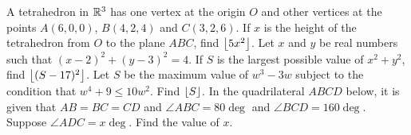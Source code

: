 \begin{enumerate}
    \begin{center}
    \end{center}
    \hyperrefitem[Q::2022-O-1-7] A tetrahedron in $\mathbb{R}^3$ has one vertex at the origin $O$ and other vertices at the points $A(6, 0, 0)$, $B(4, 2, 4)$ and $C(3, 2, 6)$. If $x$ is the height of the tetrahedron from $O$ to the plane $ABC$, find $\left\lfloor 5x^2 \right\rfloor$.
    \hyperrefitem[Q::2022-O-1-8] Let $x$ and $y$ be real numbers such that $(x-2)^2 + (y-3)^2 = 4$. If $S$ is the largest possible value of $x^2 + y^2$, find $\left\lfloor (S-17)^2 \right\rfloor$.
    \hyperrefitem[Q::2022-O-1-9] Let $S$ be the maximum value of $w^3 - 3w$ subject to the condition that $w^4 + 9 \leq 10w^2$. Find $\left\lfloor S \right\rfloor$.
    \hyperrefitem[Q::2022-O-1-10] In the quadrilateral $ABCD$ below, it is given that $AB = BC = CD$ and $\angle ABC = 80\deg$ and $\angle BCD = 160 \deg$. Suppose $\angle ADC = x\deg$. Find the value of $x$.

    \begin{center}
\end{center}
\end{enumerate}
